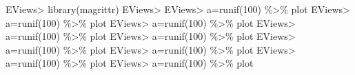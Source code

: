 \documentclass[
]{article}
\newenvironment{Shaded}{\begin{snugshade}}{\end{snugshade}}
\newcommand{\DecValTok}[1]{\textcolor[rgb]{0.00,0.00,0.81}{#1}}
\newcommand{\FunctionTok}[1]{\textcolor[rgb]{0.00,0.00,0.00}{#1}}
\newcommand{\NormalTok}[1]{#1}
\newcommand{\OtherTok}[1]{\textcolor[rgb]{0.56,0.35,0.01}{#1}}
\newcommand{\SpecialCharTok}[1]{\textcolor[rgb]{0.00,0.00,0.00}{#1}}
\begin{document}
\begin{Shaded}
\begin{Highlighting}[]
\NormalTok{EViews}\SpecialCharTok{\textgreater{}} \FunctionTok{library}\NormalTok{(magrittr)}
\NormalTok{EViews}\SpecialCharTok{\textgreater{}} 
\NormalTok{EViews}\SpecialCharTok{\textgreater{}}\NormalTok{ a}\OtherTok{=}\FunctionTok{runif}\NormalTok{(}\DecValTok{100}\NormalTok{) }\SpecialCharTok{\%\textgreater{}\%}\NormalTok{ plot}
\NormalTok{EViews}\SpecialCharTok{\textgreater{}}\NormalTok{ a}\OtherTok{=}\FunctionTok{runif}\NormalTok{(}\DecValTok{100}\NormalTok{) }\SpecialCharTok{\%\textgreater{}\%}\NormalTok{ plot}
\NormalTok{EViews}\SpecialCharTok{\textgreater{}}\NormalTok{ a}\OtherTok{=}\FunctionTok{runif}\NormalTok{(}\DecValTok{100}\NormalTok{) }\SpecialCharTok{\%\textgreater{}\%}\NormalTok{ plot}
\NormalTok{EViews}\SpecialCharTok{\textgreater{}}\NormalTok{ a}\OtherTok{=}\FunctionTok{runif}\NormalTok{(}\DecValTok{100}\NormalTok{) }\SpecialCharTok{\%\textgreater{}\%}\NormalTok{ plot}
\NormalTok{EViews}\SpecialCharTok{\textgreater{}}\NormalTok{ a}\OtherTok{=}\FunctionTok{runif}\NormalTok{(}\DecValTok{100}\NormalTok{) }\SpecialCharTok{\%\textgreater{}\%}\NormalTok{ plot}
\NormalTok{EViews}\SpecialCharTok{\textgreater{}}\NormalTok{ a}\OtherTok{=}\FunctionTok{runif}\NormalTok{(}\DecValTok{100}\NormalTok{) }\SpecialCharTok{\%\textgreater{}\%}\NormalTok{ plot}
\NormalTok{EViews}\SpecialCharTok{\textgreater{}}\NormalTok{ a}\OtherTok{=}\FunctionTok{runif}\NormalTok{(}\DecValTok{100}\NormalTok{) }\SpecialCharTok{\%\textgreater{}\%}\NormalTok{ plot}
\NormalTok{EViews}\SpecialCharTok{\textgreater{}}\NormalTok{ a}\OtherTok{=}\FunctionTok{runif}\NormalTok{(}\DecValTok{100}\NormalTok{) }\SpecialCharTok{\%\textgreater{}\%}\NormalTok{ plot}
\NormalTok{EViews}\SpecialCharTok{\textgreater{}}\NormalTok{ a}\OtherTok{=}\FunctionTok{runif}\NormalTok{(}\DecValTok{100}\NormalTok{) }\SpecialCharTok{\%\textgreater{}\%}\NormalTok{ plot}
\end{Highlighting}
\end{Shaded}
\end{document}
